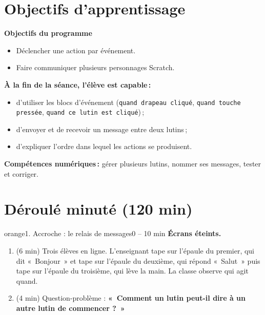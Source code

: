 \documentclass[11pt,a4paper]{article}
\begin{document}
\section{Objectifs d'apprentissage}
\begin{tcolorbox}[colback=gray!8,colframe=gray!60!black,arc=1mm,boxrule=0.5pt]
\textbf{Objectifs du programme}
\begin{itemize}
 \item Déclencher une action par événement.
 \item Faire communiquer plusieurs personnages Scratch.
\end{itemize}
\textbf{À la fin de la séance, l'élève est capable\,:}
\begin{itemize}
 \item d'utiliser les blocs d'événement (\texttt{quand drapeau cliqué}, \texttt{quand touche pressée}, \texttt{quand ce lutin est cliqué})\,;
 \item d'envoyer et de recevoir un message entre deux lutins\,;
 \item d'expliquer l'ordre dans lequel les actions se produisent.
\end{itemize}
\textbf{Compétences numériques\,:} gérer plusieurs lutins, nommer ses messages, tester et corriger.
\end{tcolorbox}

\section{Déroulé minuté (120 min)}

\begin{etape}{orange}{1. Accroche : le relais de messages}{0 -- 10 min}
\textbf{Écrans éteints.}
\begin{enumerate}
 \item (6 min) Trois élèves en ligne. L'enseignant tape sur l'épaule du premier, qui dit «~Bonjour~» et tape sur l'épaule du deuxième, qui répond «~Salut~» puis tape sur l'épaule du troisième, qui lève la main. La classe observe qui agit quand.
 \item (4 min) Question-problème : \textbf{«~Comment un lutin peut-il dire à un autre lutin de commencer ?~»}
\end{enumerate}
\end{etape}
\end{document}
